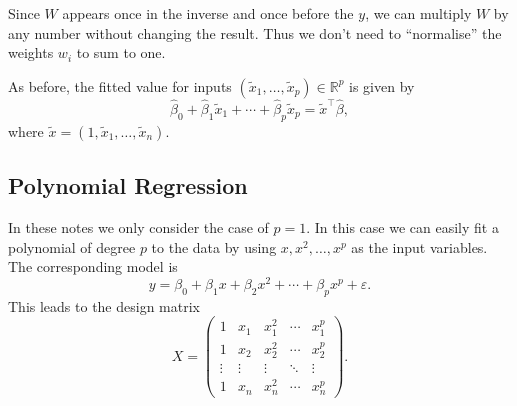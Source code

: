 \documentclass[
  a4paper,
]{article}
\theoremstyle{definition}
\theoremstyle{definition}
\theoremstyle{definition}
\theoremstyle{definition}
\theoremstyle{remark}
\begin{document}
Since \(W\) appears once in the inverse and once before the \(y\), we can
multiply \(W\) by any number without changing the result. Thus we don't
need to ``normalise'' the weights \(w_i\) to sum to one.

As before, the fitted value for inputs \((\tilde x_1, \ldots, \tilde x_p) \in
\mathbb{R}^p\) is given by
\begin{equation*}
  \hat\beta_0 + \hat\beta_1 \tilde x_1 + \cdots + \hat\beta_p \tilde x_p
  = \tilde x^\top \hat\beta,
\end{equation*}
where \(\tilde x = (1, \tilde x_1, \ldots, \tilde x_n)\).

\subsection{Polynomial Regression}\label{polynomial-regression}

In these notes we only consider the case of \(p=1\). In this case we
can easily fit a polynomial of degree \(p\) to the data by using
\(x, x^2, \ldots, x^p\) as the input variables. The corresponding
model is
\begin{equation*}
  y
  = \beta_0 + \beta_1 x + \beta_2 x^2 + \cdots + \beta_p x^p + \varepsilon.
\end{equation*}
This leads to the design matrix
\begin{equation*}
  X
  = \begin{pmatrix}
      1 & x_1 & x_1^2 & \cdots & x_1^p \\
      1 & x_2 & x_2^2 & \cdots & x_2^p \\
      \vdots & \vdots & \vdots & \ddots & \vdots \\
      1 & x_n & x_n^2 & \cdots & x_n^p
    \end{pmatrix}.
\end{equation*}
\end{document}
